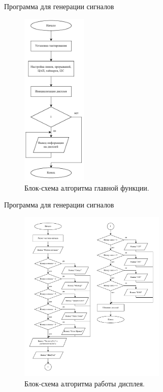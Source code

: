 \documentclass[10pt]{beamer}
\begin{document}
\begin{frame}{Программа для генерации сигналов}
  \begin{figure}
  \includegraphics[width=0.275\textwidth]{main}
  \caption{Блок-схема алгоритма главной функции.}
  \end{figure}
\end{frame}

\begin{frame}{Программа для генерации сигналов}
  \begin{figure}
  \includegraphics[width=0.625\textwidth]{display}
  \caption{Блок-схема алгоритма работы дисплея.}
  \end{figure}
\end{frame}
\end{document}
